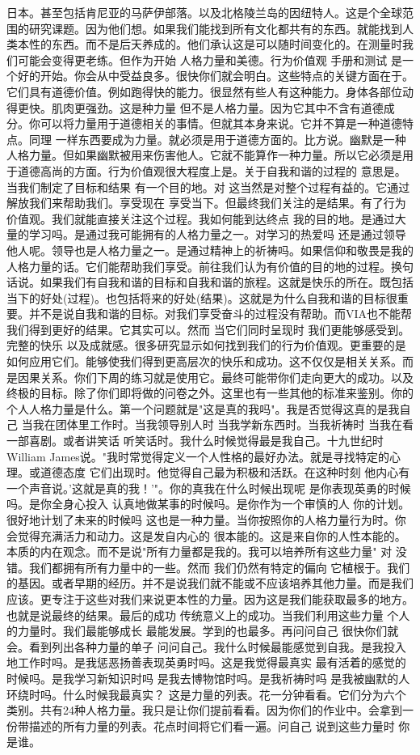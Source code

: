 日本。甚至包括肯尼亚的马萨伊部落。以及北格陵兰岛的因纽特人。这是个全球范围的研究课题。因为他们想。如果我们能找到所有文化都共有的东西。就能找到人类本性的东西。而不是后天养成的。他们承认这是可以随时间变化的。在测量时我们可能会变得更老练。但作为开始 人格力量和美德。行为价值观 手册和测试 是一个好的开始。你会从中受益良多。很快你们就会明白。这些特点的关键方面在于。它们具有道德价值。例如跑得快的能力。很显然有些人有这种能力。身体各部位动得更快。肌肉更强劲。这是种力量 但不是人格力量。因为它其中不含有道德成分。你可以将力量用于道德相关的事情。但就其本身来说。它并不算是一种道德特点。同理 一样东西要成为力量。就必须是用于道德方面的。比方说。幽默是一种人格力量。但如果幽默被用来伤害他人。它就不能算作一种力量。所以它必须是用于道德高尚的方面。行为价值观很大程度上是。关于自我和谐的过程的 意思是。当我们制定了目标和结果 有一个目的地。对 这当然是对整个过程有益的。它通过解放我们来帮助我们。享受现在 享受当下。但最终我们关注的是结果。有了行为价值观。我们就能直接关注这个过程。我如何能到达终点 我的目的地。是通过大量的学习吗。是通过我可能拥有的人格力量之一。对学习的热爱吗 还是通过领导他人呢。领导也是人格力量之一。是通过精神上的祈祷吗。如果信仰和敬畏是我的人格力量的话。它们能帮助我们享受。前往我们认为有价值的目的地的过程。换句话说。如果我们有自我和谐的目标和自我和谐的旅程。这就是快乐的所在。既包括当下的好处(过程)。也包括将来的好处(结果)。这就是为什么自我和谐的目标很重要。并不是说自我和谐的目标。对我们享受奋斗的过程没有帮助。而VIA也不能帮我们得到更好的结果。它其实可以。然而 当它们同时呈现时 我们更能够感受到。完整的快乐 以及成就感。很多研究显示如何找到我们的行为价值观。更重要的是如何应用它们。能够使我们得到更高层次的快乐和成功。这不仅仅是相关关系。而是因果关系。你们下周的练习就是使用它。最终可能带你们走向更大的成功。以及终极的目标。除了你们即将做的问卷之外。这里也有一些其他的标准来鉴别。你的个人人格力量是什么。第一个问题就是"这是真的我吗"。我是否觉得这真的是我自己 当我在团体里工作时。当我领导别人时 当我学新东西时。当我祈祷时 当我在看一部喜剧。或者讲笑话 听笑话时。我什么时候觉得最是我自己。十九世纪时 William James说。"我时常觉得定义一个人性格的最好办法。就是寻找特定的心理。或道德态度 它们出现时。他觉得自己最为积极和活跃。在这种时刻 他内心有一个声音说。'这就是真的我！'"。你的真我在什么时候出现呢 是你表现英勇的时候吗。是你全身心投入 认真地做某事的时候吗。是你作为一个审慎的人 你的计划。很好地计划了未来的时候吗 这也是一种力量。当你按照你的人格力量行为时。你会觉得充满活力和动力。这是发自内心的 很本能的。这是来自你的人性本能的。本质的内在观念。而不是说"所有力量都是我的。我可以培养所有这些力量" 对 没错。我们都拥有所有力量中的一些。然而 我们仍然有特定的偏向 它植根于。我们的基因。或者早期的经历。并不是说我们就不能或不应该培养其他力量。而是我们应该。更专注于这些对我们来说更本性的力量。因为这是我们能获取最多的地方。也就是说最终的结果。最后的成功 传统意义上的成功。当我们利用这些力量 个人的力量时。我们最能够成长 最能发展。学到的也最多。再问问自己 很快你们就会。看到列出各种力量的单子 问问自己。我什么时候最能感觉到自我。是我投入地工作时吗。是我惩恶扬善表现英勇时吗。这是我觉得最真实 最有活着的感觉的时候吗。是我学习新知识时吗 是我去博物馆时吗。是我祈祷时吗 是我被幽默的人环绕时吗。什么时候我最真实？ 这是力量的列表。花一分钟看看。它们分为六个类别。共有24种人格力量。我只是让你们提前看看。因为你们的作业中。会拿到一份带描述的所有力量的列表。花点时间将它们看一遍。问自己 说到这些力量时 你是谁。 
